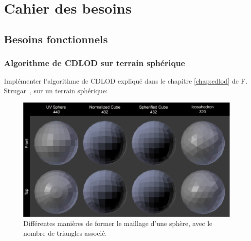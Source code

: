 \chapter{Cahier des besoins}\label{cahier-des-besoins}

\section{Besoins fonctionnels}\label{besoins-fonctionnels}

\subsection{Algorithme de CDLOD sur terrain sphérique}\label{algorithme-de-cdlod}

Implémenter l'algorithme de CDLOD expliqué dans le chapitre \ref{chap:cdlod} de F.
Strugar~\cite{CDLOD}, sur un terrain sphérique:\\

  \begin{figure}[!ht]
  \centerline{
    \includegraphics[width=12cm]{img/spheres.png}}
     \caption[Sphère génération]{Différentes manières de former le maillage d'une sphère, avec le nombre de triangles associé.\protect\footnotemark}
    \label{fig:spheres}
    \end{figure}

